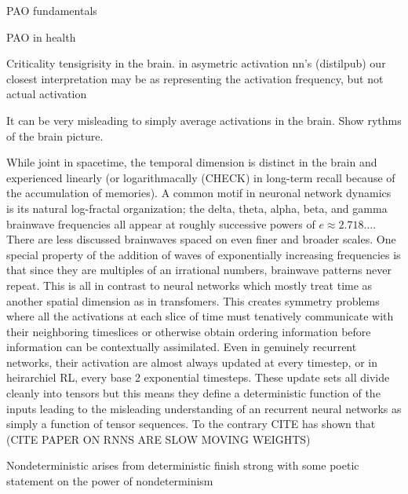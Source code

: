 PAO fundamentals

PAO in health

Criticality
  tensigrisity
  in the brain.
  in asymetric activation nn's (distilpub)
    our closest interpretation may be as representing the activation frequency, but not actual activation
    
    It can be very misleading to simply average activations in the brain. Show rythms of the brain picture.

While joint in spacetime, the temporal dimension is distinct in the brain and experienced linearly (or logarithmacally (CHECK) in long-term recall because of the accumulation of memories). A common motif in neuronal network dynamics is its natural log-fractal organization; the delta, theta, alpha, beta, and gamma brainwave frequencies all appear at roughly successive powers of $e\approx 2.718\dots$. There are less discussed brainwaves spaced on even finer and broader scales. One special property of the addition of waves of exponentially increasing frequencies is that since they are multiples of an irrational numbers, brainwave patterns never repeat. This is all in contrast to neural networks which mostly treat time as another spatial dimension as in transfomers. This creates symmetry problems where all the activations at each slice of time must tenatively communicate with their neighboring timeslices or otherwise obtain ordering information before information can be contextually assimilated. Even in genuinely recurrent networks, their activation are almost always updated at every timestep, or in heirarchiel RL, every base 2 exponential timesteps. These update sets all divide cleanly into tensors but this means they define a deterministic function of the inputs leading to the misleading understanding of an recurrent neural networks as simply a function of tensor sequences. To the contrary CITE has shown that (CITE PAPER ON RNNS ARE SLOW MOVING WEIGHTS)  

Nondeterministic arises from deterministic
    finish strong with some poetic statement on the power of nondeterminism
 
